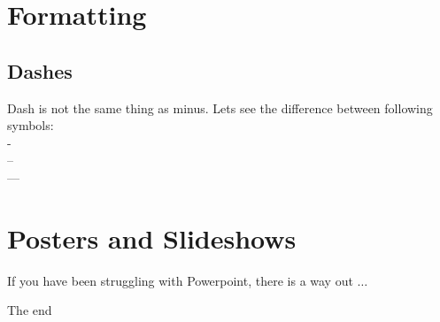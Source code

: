 \documentclass[a4paper,10pt]{report} %
\begin{document}
  
\section{Formatting}
\subsection{Dashes}
Dash is not the same thing as minus. 
Lets see the difference between following symbols:\\
- \\
-- \\
--- \\
 
 \section{Posters and Slideshows} 
 If you have been struggling with Powerpoint, there is a way out \( \ldots \) 
 

 




\newpage
\label{LastPage}
\begin{center}
 The end
\end{center}
\end{document}
